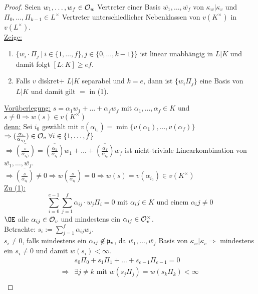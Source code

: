 
\begin{proof}
Seien $w_1, \dots, w_f \in \mathcal{O}_w$ Vertreter einer Basis $\overline{w_1}, \dots, \overline{w_f}$ von $\kappa_w | \kappa_v$ und $\Pi_0, \dots, \Pi_{k-1} \in L^\times $ Vertreter unterschiedlicher Nebenklassen von $v(K^\times)$ in $v(L^\times)$.\\
\underline{Zeige:} \begin{enumerate}[(1)]
\item $\{w_i \cdot \Pi_j \ | \ i \in \{1, \dots, f\}, j \in \{0 , \dots, k-1\}\}$ ist linear unabhängig in $L|K$ und damit folgt $[L:K] \geq ef$.
\item Falls $v$ diskret+ $L|K$ separabel und $k=e$, dann ist $\{w_i\Pi_j\}$ eine Basis von $L|K$ und damit gilt \glqq $=$ \grqq in (1).
\end{enumerate}
\underline{Vorüberlegung:} $s=\alpha_1w_1 + \dots + \alpha_f w_f$ mit $\alpha_1, \dots, \alpha_f \in K$ und $s \neq 0 \Rightarrow w(s) \in v(K^\times)$\\
\underline{denn:} Sei $i_0$ gewählt mit $v(\alpha_{i_0})=\min\{v(\alpha_1), \dots, v(\alpha_f)\}$\\
$\Rightarrow (\frac{\alpha_i}{\alpha_{i_0}}) \in \mathcal{O}_v \ \forall i \in \{1, \dots, f\}$\\
$\Rightarrow \overline{(\frac{s}{\alpha_{i_0)}})}=\overline{(\frac{\alpha_1}{\alpha_{i_0}})}\overline{w_1}+\dots+\overline{(\frac{\alpha_f}{\alpha_{i_0}})} \overline{w_f}$ ist nicht-triviale Linearkombination von $\overline{w_1}, \dots, \overline{w_f}$.\\
$\Rightarrow \overline{(\frac{s}{\alpha_{i_0}})}\neq 0 \Rightarrow w(\frac{s}{\alpha_{i_0}})=0 \Rightarrow w(s)=v(\alpha_{i_0}) \in v(K^\times)$\\
\underline{Zu (1):}
\[\sum_{i=0}^{e-1}\sum_{j=1}^f \alpha_{ij} \cdot w_j \Pi_i = 0 \text{ mit } \alpha_ij \in K \text{ und einem } \alpha_ij \neq 0\]
$\OE$ alle $\alpha_{ij} \in \mathcal{O}_v$ und mindestens ein $\alpha_{ij} \in \mathcal{O}_v^\times$.\\
Betrachte: $s_i:=\sum_{j=1}^f \alpha_{ij} w_j$.\\
$s_i \neq 0$, falls mindestens ein $\alpha_{ij} \not \in \mathfrak{p}_v$, da $\overline{w_1}, \dots, \overline{w_f}$ Basis von $\kappa_w | \kappa_v \Rightarrow$ mindestens ein $s_i \neq 0$ und damit $w(s_i)< \infty$.
\begin{align*}
&s_0\Pi_0+s_1\Pi_1+\ldots+s_{e-1}\Pi_{e-1}=0\\
\Rightarrow & \exists j \neq k \text{ mit } w(s_j \Pi_j)=w(s_k \Pi_k) < \infty\\

\end{align*}
\end{proof}
